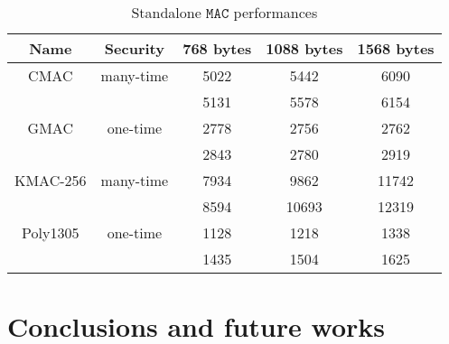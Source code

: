 \documentclass[floatrow,journal=tches,submission]{iacrtrans}
\newcommand{\mac}{\texttt{MAC}}
\begin{document}
\begin{table}[H]
    \centering
    \begin{tabular}{|c|c|c|c|c|}
        \hline
        Name & Security & 768 bytes & 1088 bytes & 1568 bytes \\
        \hline
        CMAC & many-time & 5022 & 5442 & 6090 \\
        & & 5131 & 5578 & 6154 \\
        \hline
        GMAC & one-time & 2778 & 2756 & 2762 \\
        & & 2843 & 2780 & 2919 \\
        \hline
        KMAC-256 & many-time & 7934 & 9862 & 11742 \\
        & & 8594 & 10693 & 12319 \\
        \hline
        Poly1305 & one-time & 1128 & 1218 & 1338 \\
        & & 1435 & 1504 & 1625 \\
        \hline
    \end{tabular}
    \caption{Standalone $\mac$ performances}\label{tbl:standalone-mac-perf}
\end{table}


\section{Conclusions and future works}\label{sec:future-works}



\end{document}
